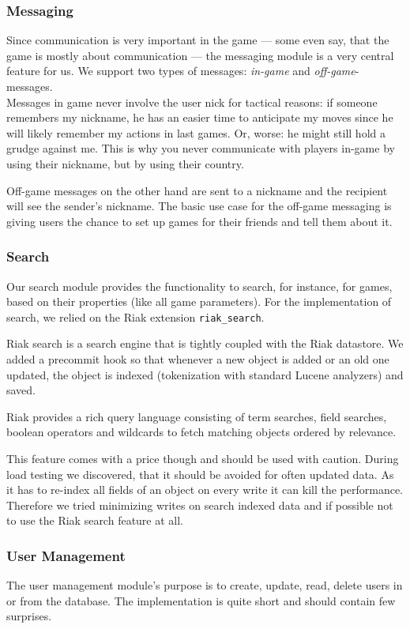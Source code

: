 \documentclass[11pt,a4paper]{report}
\begin{document}
\subsubsection{Messaging}
Since communication is very important in the game --- some even say, that the
game is mostly about communication --- the messaging module is a very central
feature for us. We support two types of messages: {\em in-game\/} and
{\em off-game\/}-messages.\\
Messages in game never involve the user nick for tactical reasons: if someone
remembers my nickname, he has an easier time to anticipate my moves since he
will likely remember my actions in last games.
Or, worse: he might still hold a grudge against me. This is why you never
communicate with players in-game by using their nickname, but by using their
country.

Off-game messages on the other hand are sent to a nickname and the recipient
will see the sender's nickname. The basic use case for the off-game messaging
is giving users the chance to set up games for their friends and tell them
about it.
\subsubsection{Search}
Our search module provides the functionality to search, for instance, for
games, based on their properties (like all game parameters). For the
implementation of search, we relied on the Riak extension {\tt riak\_search}.

Riak search is a search engine that is tightly coupled with the Riak datastore.
We added a precommit hook so that whenever a new object is added or an old one
updated, the object is indexed (tokenization with standard Lucene analyzers)
and saved.

Riak provides a rich query language consisting of term searches, field searches,
boolean operators and wildcards to fetch matching objects ordered by relevance.

This feature comes with a price though and should be used with caution.
During load testing we discovered, that it should be avoided for often updated
data.
As it has to re-index all fields of an object on every write it can kill the
performance.
Therefore we tried minimizing writes on search indexed data and if possible not
to use the Riak search feature at all.

\subsubsection{User Management}
The user management module's purpose is to create, update, read, delete users
in or from the database. The implementation is quite short and should contain
few surprises.
\end{document}
